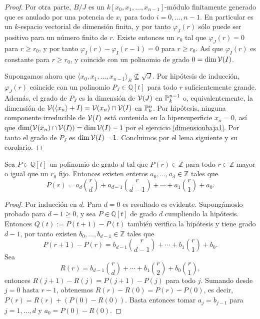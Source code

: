 \documentclass[ACGA.tex]{subfiles}
\begin{document}
\begin{proof}
Por otra parte, $B/J$ es un $k[x_0,x_1,\ldots,x_{n-1}]$-módulo finitamente generado que es anulado por una potencia de $x_i$ para todo $i=0,\ldots,n-1$. En particular es un $k$-espacio vectorial de dimensión finita, y por tanto $\varphi_J(r)$ sólo puede ser positivo para un número finito de $r$. Existe entonces un $r_0$ tal que $\varphi_J(r)=0$ para $r\geq r_0$, y por tanto $\varphi_I(r)-\varphi_I(r-1)=0$ para $r\geq r_0$. Así que $\varphi_I(r)$ es constante para $r\geq r_0$, y coincide con un polinomio de grado $0=\dim\mathcal{V}(I)$.

Supongamos ahora que $\langle x_0,x_1,\ldots,x_{n-1}\rangle_B\not\subseteq \sqrt{J}$. Por hipótesis de inducción, $\varphi_J(r)$ coincide con un polinomio $P_J\in{\mathbb Q}[t]$ para todo $r$ suficientemente grande. Además, el grado de $P_J$ es la dimensión de $\mathcal{V}(J)$ en $\mathbb{P}^{n-1}_k$ o, equivalentemente, la dimensión de $\mathcal{V}(\langle x_n\rangle +I)=\mathcal{V}(x_n)\cap\mathcal{V}(I)$ en $\mathbb{P}^n_k$. Por hipótesis, ninguna componente irreducible de $\mathcal{V}(I)$ está contenida en la hipersuperficie $x_n=0$, así que $\dim(\mathcal{V}(x_n)\cap\mathcal{V}(I))=\dim\mathcal{V}(I)-1$ por el ejercicio \ref{dimensionbaja1}. Por tanto el grado de $P_J$ es $\dim\mathcal{V}(I)-1$. Concluimos por el lema siguiente y su corolario.
\end{proof}

\begin{lemma}
 Sea $P\in{\mathbb Q}[t]$ un polinomio de grado $d$ tal que $P(r)\in{\mathbb Z}$ para todo $r\in{\mathbb Z}$ mayor o igual que un $r_0$ fijo. Entonces existen enteros $a_0,\ldots,a_d\in{\mathbb Z}$ tales que
$$
P(r)=a_d{r\choose d}+a_{d-1}{r\choose{d-1}}+\cdots+a_1{r\choose 1}+a_0.
$$
\end{lemma}

\begin{proof}
 Por inducción en $d$. Para $d=0$ es resultado es evidente. Supongámoslo probado para $d-1\geq 0$, y sea $P\in{\mathbb Q}[t]$ de grado $d$ cumpliendo la hipótesis. Entonces $Q(t):=P(t+1)-P(t)$ también verifica la hipótesis y tiene grado $d-1$, por tanto existen $b_0,\ldots,b_{d-1}\in{\mathbb Z}$ tales que 
$$
P(r+1)-P(r)=b_{d-1}{r\choose{d-1}}+\cdots+b_1{r\choose 1}+b_0.
$$
Sea
$$
R(r)=b_{d-1}{r\choose{d}}+\cdots+b_1{r\choose 2}+b_0{r\choose 1},
$$
entonces $R(j+1)-R(j)=P(j+1)-P(j)$ para todo $j$. Sumando desde $j=0$ hasta $r-1$, obtenemos $R(r)-R(0)=P(r)-P(0)$, es decir, $P(r)=R(r)+(P(0)-R(0))$. Basta entonces tomar $a_j=b_{j-1}$ para $j=1,\ldots,d$ y $a_0=P(0)-R(0)$.
\end{proof}
\end{document}
